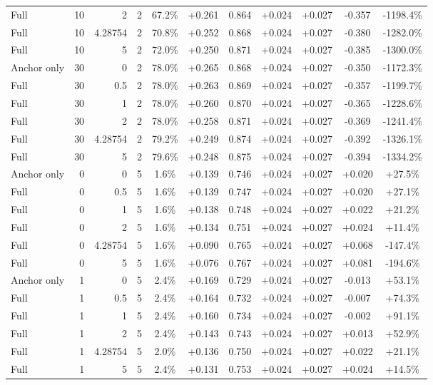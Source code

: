 \begin{table}[htbp]
\begin{tabular}{lrrrccccccc}
Full & 10 & 2 & 2 & 67.2\% & +0.261 & 0.864 & +0.024 & +0.027 & -0.357 & -1198.4\% \\
Full & 10 & 4.28754 & 2 & 70.8\% & +0.252 & 0.868 & +0.024 & +0.027 & -0.380 & -1282.0\% \\
Full & 10 & 5 & 2 & 72.0\% & +0.250 & 0.871 & +0.024 & +0.027 & -0.385 & -1300.0\% \\
Anchor only & 30 & 0 & 2 & 78.0\% & +0.265 & 0.868 & +0.024 & +0.027 & -0.350 & -1172.3\% \\
Full & 30 & 0.5 & 2 & 78.0\% & +0.263 & 0.869 & +0.024 & +0.027 & -0.357 & -1199.7\% \\
Full & 30 & 1 & 2 & 78.0\% & +0.260 & 0.870 & +0.024 & +0.027 & -0.365 & -1228.6\% \\
Full & 30 & 2 & 2 & 78.0\% & +0.258 & 0.871 & +0.024 & +0.027 & -0.369 & -1241.4\% \\
Full & 30 & 4.28754 & 2 & 79.2\% & +0.249 & 0.874 & +0.024 & +0.027 & -0.392 & -1326.1\% \\
Full & 30 & 5 & 2 & 79.6\% & +0.248 & 0.875 & +0.024 & +0.027 & -0.394 & -1334.2\% \\
Anchor only & 0 & 0 & 5 & 1.6\% & +0.139 & 0.746 & +0.024 & +0.027 & +0.020 & +27.5\% \\
Full & 0 & 0.5 & 5 & 1.6\% & +0.139 & 0.747 & +0.024 & +0.027 & +0.020 & +27.1\% \\
Full & 0 & 1 & 5 & 1.6\% & +0.138 & 0.748 & +0.024 & +0.027 & +0.022 & +21.2\% \\
Full & 0 & 2 & 5 & 1.6\% & +0.134 & 0.751 & +0.024 & +0.027 & +0.024 & +11.4\% \\
Full & 0 & 4.28754 & 5 & 1.6\% & +0.090 & 0.765 & +0.024 & +0.027 & +0.068 & -147.4\% \\
Full & 0 & 5 & 5 & 1.6\% & +0.076 & 0.767 & +0.024 & +0.027 & +0.081 & -194.6\% \\
Anchor only & 1 & 0 & 5 & 2.4\% & +0.169 & 0.729 & +0.024 & +0.027 & -0.013 & +53.1\% \\
Full & 1 & 0.5 & 5 & 2.4\% & +0.164 & 0.732 & +0.024 & +0.027 & -0.007 & +74.3\% \\
Full & 1 & 1 & 5 & 2.4\% & +0.160 & 0.734 & +0.024 & +0.027 & -0.002 & +91.1\% \\
Full & 1 & 2 & 5 & 2.4\% & +0.143 & 0.743 & +0.024 & +0.027 & +0.013 & +52.9\% \\
Full & 1 & 4.28754 & 5 & 2.0\% & +0.136 & 0.750 & +0.024 & +0.027 & +0.022 & +21.1\% \\
Full & 1 & 5 & 5 & 2.4\% & +0.131 & 0.753 & +0.024 & +0.027 & +0.024 & +14.5\% \\

\end{tabular}
\end{table}
